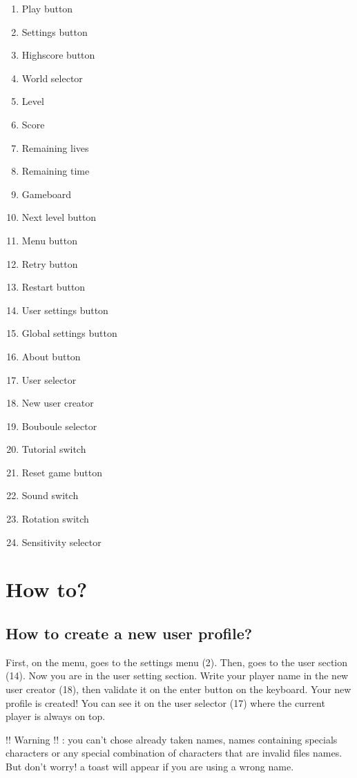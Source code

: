 \documentclass[a4paper,10pt]{report}
\begin{document}
\begin{multicols}{3}
\begin{enumerate}
\item Play button
\item Settings button
\item Highscore button
\item World selector
\item Level
\item Score
\item Remaining lives
\item Remaining time
\item Gameboard
\item Next level button
\item Menu button
\item Retry button
\item Restart button
\item User settings button
\item Global settings button
\item About button
\item User selector
\item New user creator
\item Bouboule selector
\item Tutorial switch
\item Reset game button
\item Sound switch
\item Rotation switch
\item Sensitivity selector
\end{enumerate}
\end{multicols}


\section*{How to?}

	\subsection*{How to create a new user profile?}
First, on the menu, goes to the settings menu (2). Then, goes to the user section (14). Now you are in the user setting section. Write your player name in the new user creator (18), then validate it on the enter button on the keyboard. Your new profile is created! You can see it on the user selector (17) where the current player is always on top.

!! Warning !! : you can't chose already taken names, names containing specials characters or any special combination of characters that are invalid files names. But don't worry! a toast will appear if you are using a wrong name.
\end{document}
